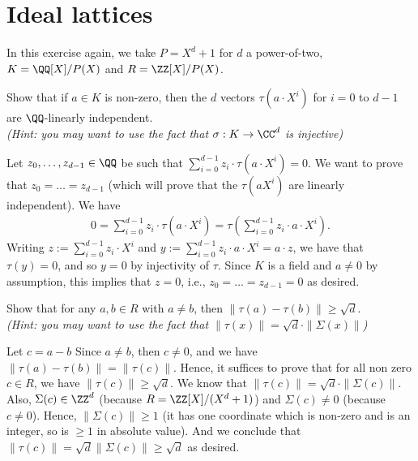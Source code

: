 \documentclass[11pt]{exam}
\theoremstyle{definition}
\begin{document}
\section{Ideal lattices}
\label{exo:id-lat}

In this exercise again, we take $P = X^d+1$ for $d$ a power-of-two, $K = \QQ[X]/P(X)$ and $R = \ZZ[X]/P(X)$.

\begin{questions}
\question Show that if $a \in K$ is non-zero, then the $d$ vectors $\tau(a \cdot X^i)$ for $i = 0$ to ${d-1}$ are $\QQ$-linearly independent. \\
\textit{\color{gray}(Hint: you may want to use the fact that $\sigma: K \rightarrow \CC^d$ is injective)}

\begin{solution}
Let $z_0, \dots, z_{d-1} \in \QQ$ be such that $\sum_{i = 0}^{d-1} z_i \cdot \tau(a \cdot X^i) = 0$. We want to prove that $z_0 = \dots = z_{d-1}$ (which will prove that the $\tau(a X^i)$ are linearly independent).
We have 
\begin{align*}
0 = \sum_{i = 0}^{d-1} z_i \cdot \tau(a \cdot X^i) = \tau(\sum_{i = 0}^{d-1} z_i \cdot a \cdot X^i).
\end{align*}
Writing $z := \sum_{i = 0}^{d-1} z_i\cdot X^i$ and $y := \sum_{i = 0}^{d-1} z_i \cdot a \cdot X^i = a \cdot z$, we have that $\tau(y) = 0$, and so $y = 0$ by injectivity of $\tau$. Since $K$ is a field and $a \neq 0$ by assumption, this implies that $z = 0$, i.e., $z_0 = \dots = z_{d-1} = 0$ as desired.
\end{solution}

\question Show that for any $a,b \in R$ with $a \neq b$, then $\|\tau(a) - \tau(b)\| \geq \sqrt{d}$. \\
\textit{\color{gray}(Hint: you may want to use the fact that $\|\tau(x)\| = \sqrt{d} \cdot \|\Sigma(x)\|$)}

\begin{solution}
Let $c = a-b$ Since $a \neq b$, then $c \neq 0$, and we have $\|\tau(a) - \tau(b)\| = \|\tau(c)\|$. Hence, it suffices to prove that for all non zero $c \in R$, we have $\|\tau(c)\| \geq \sqrt{d}$. We know that $\|\tau(c)\| = \sqrt{d} \cdot \|\Sigma(c)\|$. Also, $\Sigma(c) \in \ZZ^d$ (because $R = \ZZ[X]/(X^d+1)$) and $\Sigma(c) \neq 0$ (because $c \neq 0$). Hence, $\|\Sigma(c)\| \geq 1$ (it has one coordinate which is non-zero and is an integer, so is $\geq 1$ in absolute value). And we conclude that $\|\tau(c)\| = \sqrt{d} \|\Sigma(c)\| \geq \sqrt{d}$ as desired.
\end{solution}


\end{questions}
\end{document}
